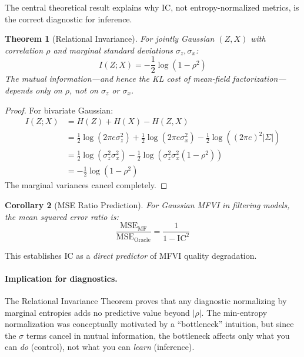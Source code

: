 \documentclass[10pt]{article} %
\theoremstyle{plain}
\newtheorem{theorem}{Theorem}[section]
\newtheorem{corollary}[theorem]{Corollary}
\theoremstyle{definition}
\newcommand{\IC}{\mathrm{IC}}  %
\begin{document}
The central theoretical result explains why IC, not entropy-normalized metrics, is the correct diagnostic for inference.

\begin{theorem}[Relational Invariance]
\label{thm:relational-invariance}
For jointly Gaussian $(Z, X)$ with correlation $\rho$ and marginal standard deviations $\sigma_z, \sigma_x$:
\begin{equation}
I(Z; X) = -\frac{1}{2}\log(1 - \rho^2)
\end{equation}
The mutual information---and hence the KL cost of mean-field factorization---depends \emph{only} on $\rho$, not on $\sigma_z$ or $\sigma_x$.
\end{theorem}

\begin{proof}
For bivariate Gaussian:
\begin{align}
I(Z; X) &= H(Z) + H(X) - H(Z, X) \\
&= \frac{1}{2}\log(2\pi e\sigma_z^2) + \frac{1}{2}\log(2\pi e\sigma_x^2) - \frac{1}{2}\log((2\pi e)^2|\Sigma|) \\
&= \frac{1}{2}\log(\sigma_z^2\sigma_x^2) - \frac{1}{2}\log(\sigma_z^2\sigma_x^2(1-\rho^2)) \\
&= -\frac{1}{2}\log(1-\rho^2)
\end{align}
The marginal variances cancel completely.
\end{proof}

\begin{corollary}[MSE Ratio Prediction]
\label{cor:mse-ratio}
For Gaussian MFVI in filtering models, the mean squared error ratio is:
\begin{equation}
\frac{\text{MSE}_{\text{MF}}}{\text{MSE}_{\text{Oracle}}} = \frac{1}{1 - \IC^2}
\label{eq:mse-ratio}
\end{equation}
\end{corollary}

\noindent This establishes IC as a \emph{direct predictor} of MFVI quality degradation.

\paragraph{Implication for diagnostics.} The Relational Invariance Theorem proves that any diagnostic normalizing by marginal entropies adds no predictive value beyond $|\rho|$. The min-entropy normalization was conceptually motivated by a ``bottleneck'' intuition, but since the $\sigma$ terms cancel in mutual information, the bottleneck affects only what you can \emph{do} (control), not what you can \emph{learn} (inference).
\end{document}
